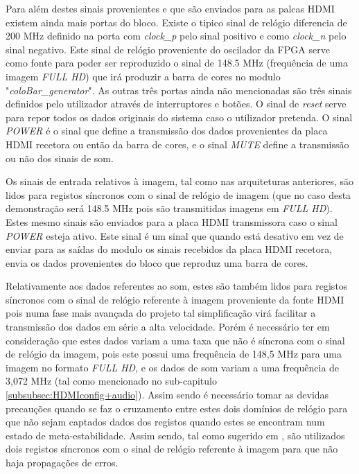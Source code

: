 Para além destes sinais provenientes e que são enviados para as palcas HDMI existem ainda mais portas do bloco. Existe o tipico sinal de relógio diferencia de 200 MHz definido na porta com \textit{clock\_p} pelo sinal positivo e como \textit{clock\_n} pelo sinal negativo. Este sinal de relógio proveniente do oscilador da FPGA serve como fonte para poder ser reproduzido o sinal de 148.5 MHz (frequência de uma imagem \textit{FULL HD}) que irá produzir a barra de cores no modulo "\textit{coloBar\_generator}". As outras três portas ainda não mencionadas são três sinais definidos pelo utilizador através de interruptores e botões. O sinal de \textit{reset} serve para repor todos os dados originais do sistema caso o utilizador pretenda. O sinal \textit{POWER} é o sinal que define a transmissão dos dados provenientes da placa HDMI recetora ou então da barra de cores, e o sinal \textit{MUTE} define a transmissão ou não dos sinais de som.


Os sinais de entrada relativos à imagem, tal como nas arquiteturas anteriores, são lidos para registos síncronos com o sinal de relógio de imagem (que no caso desta demonstração será 148.5 MHz pois são transmitidas imagens em \textit{FULL HD}). Estes mesmo sinais são enviados para a placa HDMI transmissora caso o sinal \textit{POWER} esteja ativo. Este sinal é um sinal que quando está desativo em vez de enviar para as saídas do modulo os sinais recebidos da placa HDMI recetora, envia os dados provenientes do bloco que reproduz uma barra de cores.

Relativamente aos dados referentes ao som, estes são também lidos para registos síncronos com o sinal de relógio referente à imagem proveniente da fonte HDMI pois numa fase mais avançada do projeto tal simplificação virá facilitar a transmissão dos dados em série a alta velocidade. Porém é necessário ter em consideração que estes dados variam a uma taxa que não é síncrona com o sinal de relógio da imagem, pois este possui uma frequência de 148,5 MHz para uma imagem no formato \textit{FULL HD}, e os dados de som variam a uma frequência de 3,072 MHz (tal como mencionado no sub-capitulo \ref{subsubsec:HDMIconfig+audio}). Assim sendo é necessário tomar as devidas precauções quando se faz o cruzamento entre estes dois domínios de relógio para que não sejam captados dados dos registos quando estes se encontram num estado de meta-estabilidade. Assim sendo, tal como sugerido em \cite{R024}, são utilizados dois registos síncronos com o sinal de relógio referente à imagem para que não haja propagações de erros.


